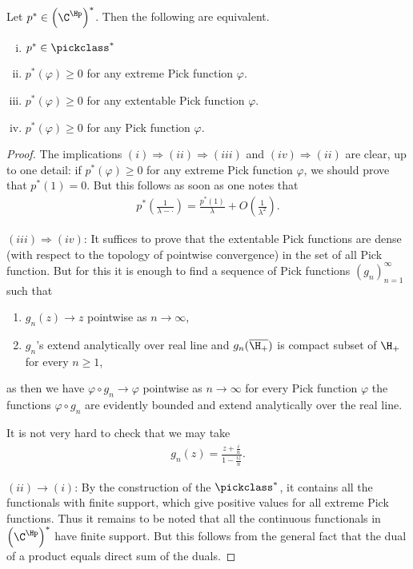 \begin{lause}\label{pick_functionals}
	Let $p^{*} \in \left(\C^{\Hp}\right)^{*}$. Then the following are equivalent.
	\begin{enumerate}[(i)]
		\item $p^{*} \in \pickclass^{*}$
		\item $p^{*}(\varphi) \geq 0$ for any extreme Pick function $\varphi$.
		\item $p^{*}(\varphi) \geq 0$ for any extentable Pick function $\varphi$.
		\item $p^{*}(\varphi) \geq 0$ for any Pick function $\varphi$.
	\end{enumerate}
\end{lause}
\begin{proof}
	The implications $(i) \Rightarrow (ii) \Rightarrow (iii)$ and $(iv) \Rightarrow (ii)$ are clear, up to one detail: if $p^{*}(\varphi) \geq 0$ for any extreme Pick function $\varphi$, we should prove that $p^{*}(1) = 0$. But this follows as soon as one notes that
	\begin{align*}
		p^{*}\left(\frac{1}{\lambda - \cdot}\right) = \frac{p^{*}\left(1\right)}{\lambda} + O\left(\frac{1}{\lambda^2}\right).
	\end{align*}

	$(iii) \Rightarrow (iv)$: It suffices to prove that the extentable Pick functions are dense (with respect to the topology of pointwise convergence) in the set of all Pick function. But for this it is enough to find a sequence of Pick functions $(g_{n})_{n = 1}^{\infty}$ such that
	\begin{enumerate}
		\item $g_{n}(z) \to z$ pointwise as $n \to \infty$,
		\item $g_{n}$'s extend analytically over real line and $g_{n}(\overline{\H_{+}})$ is compact subset of $\H_{+}$ for every $n \geq 1$,
	\end{enumerate}
	as then we have $\varphi \circ g_{n} \to \varphi$ pointwise as $n \to \infty$ for every Pick function $\varphi$ the functions $\varphi \circ g_{n}$ are evidently bounded and extend analytically over the real line.

	It is not very hard to check that we may take
	\begin{align*}
		g_{n}(z) = \frac{z + \frac{i}{n}}{1 - \frac{i z}{n}}.
	\end{align*}

	$(ii) \rightarrow (i)$: By the construction of the $\pickclass^{*}$, it contains all the functionals with finite support, which give positive values for all extreme Pick functions. Thus it remains to be noted that all the continuous functionals in $\left(\C^{\Hp}\right)^{*}$ have finite support. But this follows from the general fact that the dual of a product equals direct sum of the duals.
\end{proof}

